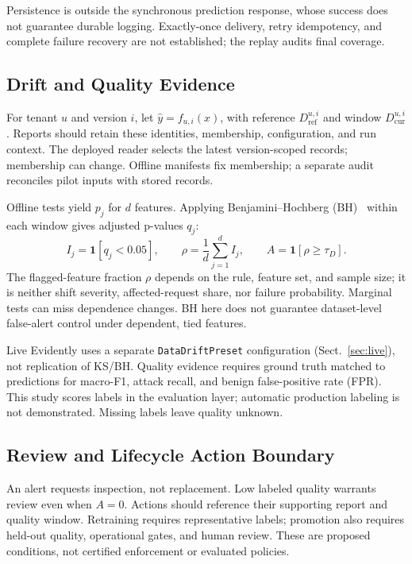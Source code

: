 \documentclass[runningheads]{llncs}
\begin{document}
Persistence is outside the synchronous prediction response, whose success does not guarantee durable logging. Exactly-once delivery, retry idempotency, and complete failure recovery are not established; the replay audits final coverage.

\subsection{Drift and Quality Evidence}
For tenant $u$ and version $i$, let $\hat y=f_{u,i}(x)$, with reference $D_{\mathrm{ref}}^{u,i}$ and window $D_{\mathrm{cur}}^{u,i}$. Reports should retain these identities, membership, configuration, and run context. The deployed reader selects the latest version-scoped records; membership can change. Offline manifests fix membership; a separate audit reconciles pilot inputs with stored records.

Offline tests yield $p_j$ for $d$ features. Applying Benjamini--Hochberg (BH)~\cite{bh1995} within each window gives adjusted p-values $q_j$:
\begin{equation}
I_j=\mathbf{1}[q_j<0.05],\qquad
\rho=\frac{1}{d}\sum_{j=1}^{d}I_j,\qquad
A=\mathbf{1}[\rho\geq\tau_D].
\label{eq:drift}
\end{equation}
The flagged-feature fraction $\rho$ depends on the rule, feature set, and sample size; it is neither shift severity, affected-request share, nor failure probability. Marginal tests can miss dependence changes. BH here does not guarantee dataset-level false-alert control under dependent, tied features.

Live Evidently uses a separate \texttt{DataDriftPreset} configuration (Sect.~\ref{sec:live}), not replication of KS/BH. Quality evidence requires ground truth matched to predictions for macro-F1, attack recall, and benign false-positive rate (FPR). This study scores labels in the evaluation layer; automatic production labeling is not demonstrated. Missing labels leave quality unknown.

\subsection{Review and Lifecycle Action Boundary}
An alert requests inspection, not replacement. Low labeled quality warrants review even when $A=0$. Actions should reference their supporting report and quality window. Retraining requires representative labels; promotion also requires held-out quality, operational gates, and human review. These are proposed conditions, not certified enforcement or evaluated policies.
\end{document}
